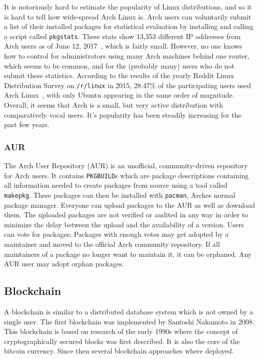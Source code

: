 It is notoriously hard to estimate the popularity of Linux distributions, and so it is hard to tell how wide-spread Arch Linux is.
Arch users can voluntarily submit a list of their installed packages for statistical evaluation by installing and calling a script called \texttt{pkgstats}.
These stats show 13,353 different IP addresses from Arch users as of June 12, 2017~\cite{arch:stats}, which is fairly small.
However, no one knows how to control for administrators using many Arch machines behind one router, which seems to be common, and for the (probably many) users who do not submit these statistics.
According to the results of the yearly Reddit Linux Distribution Survey on \texttt{/r/linux} in 2015, 28.47\% of the participating users used Arch Linux~\cite{linuxsurvey}, with only Ubuntu appearing in the same order of magnitude.
Overall, it seems that Arch is a small, but very active distribution with comparatively vocal users. It's popularity has been steadily increasing for the past few years.

\subsubsection{AUR}
The Arch User Repository (AUR) is an unofficial, community-driven repository for Arch users.
It contains \texttt{PKGBUILD}s which are package descriptions containing all information needed to create packages from source using a tool called \texttt{makepkg}.
These packages can then be installed with \texttt{pacman}, Arches normal package manager.
Everyone can upload packages to the AUR as well as download them.
The uploaded packages are not verified or audited in any way in order to minimize the delay between the upload and the availability of a version.
Users can vote for packages; Packages with enough votes may get adopted by a maintainer and moved to the official Arch community repository.
If all maintainers of a package no longer want to maintain it, it can be orphaned. Any AUR user may adopt orphan packages.
\cite{wiki:AUR}

\subsection{Blockchain}\label{sec:ABCblockchain}
A blockchain is similar to a distributed database system which is not owned by a single user.
The first blockchain was implemented by Santoshi Nakamoto in 2008.
This blockchain is based on research of the early 1990s where the concept of cryptographically secured blocks was first described.
It is also the core of the bitcoin currency.
Since then several blockchain approaches where deployed.

